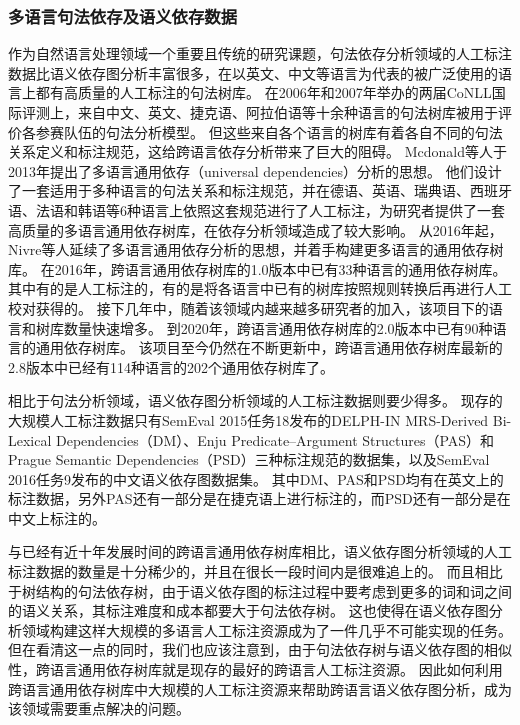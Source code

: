 \subsubsection{多语言句法依存及语义依存数据}

作为自然语言处理领域一个重要且传统的研究课题，句法依存分析领域的人工标注数据比语义依存图分析丰富很多，在以英文、中文等语言为代表的被广泛使用的语言上都有高质量的人工标注的句法树库。
在2006年\cite{buchholz-marsi-2006-conllx}和2007年\cite{nivre-etal-2007-conll}举办的两届CoNLL国际评测上，来自中文、英文、捷克语、阿拉伯语等十余种语言的句法树库被用于评价各参赛队伍的句法分析模型。
但这些来自各个语言的树库有着各自不同的句法关系定义和标注规范，这给跨语言依存分析带来了巨大的阻碍。
Mcdonald等人于2013年提出了多语言通用依存（universal dependencies）分析的思想\cite{mcdonald-etal-2013-universal}。
他们设计了一套适用于多种语言的句法关系和标注规范，并在德语、英语、瑞典语、西班牙语、法语和韩语等6种语言上依照这套规范进行了人工标注，为研究者提供了一套高质量的多语言通用依存树库，在依存分析领域造成了较大影响。
从2016年起，Nivre等人延续了多语言通用依存分析的思想，并着手构建更多语言的通用依存树库。
在2016年，跨语言通用依存树库的1.0版本\cite{nivre-2016-etal-universal}中已有33种语言的通用依存树库。
其中有的是人工标注的，有的是将各语言中已有的树库按照规则转换后再进行人工校对获得的。
接下几年中，随着该领域内越来越多研究者的加入，该项目下的语言和树库数量快速增多。
到2020年，跨语言通用依存树库的2.0版本\cite{nivre-etal-2020-universal}中已有90种语言的通用依存树库。
该项目至今仍然在不断更新中，跨语言通用依存树库最新的2.8版本中已经有114种语言的202个通用依存树库了。

相比于句法分析领域，语义依存图分析领域的人工标注数据则要少得多。
现存的大规模人工标注数据只有SemEval 2015任务18\cite{oepen-etal-2015-semeval}发布的DELPH-IN MRS-Derived Bi-Lexical Dependencies（DM）、Enju Predicate–Argument Structures（PAS）和Prague Semantic Dependencies（PSD）三种标注规范的数据集，以及SemEval 2016任务9\cite{che-etal-2016-semeval}发布的中文语义依存图数据集。
其中DM、PAS和PSD均有在英文上的标注数据，另外PAS还有一部分是在捷克语上进行标注的，而PSD还有一部分是在中文上标注的。

与已经有近十年发展时间的跨语言通用依存树库相比，语义依存图分析领域的人工标注数据的数量是十分稀少的，并且在很长一段时间内是很难追上的。
而且相比于树结构的句法依存树，由于语义依存图的标注过程中要考虑到更多的词和词之间的语义关系，其标注难度和成本都要大于句法依存树。
这也使得在语义依存图分析领域构建这样大规模的多语言人工标注资源成为了一件几乎不可能实现的任务。
但在看清这一点的同时，我们也应该注意到，由于句法依存树与语义依存图的相似性，跨语言通用依存树库就是现存的最好的跨语言人工标注资源。
因此如何利用跨语言通用依存树库中大规模的人工标注资源来帮助跨语言语义依存图分析，成为该领域需要重点解决的问题。

